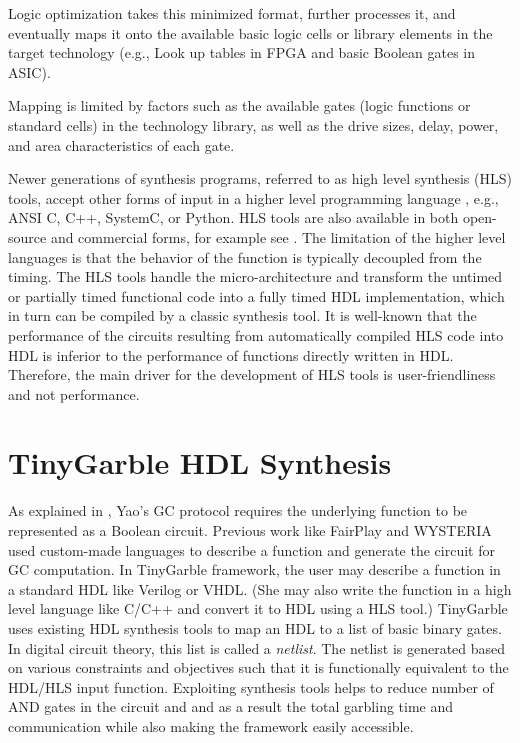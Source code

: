 Logic optimization takes this minimized format, further processes it, and eventually maps it onto the available basic logic cells or library elements in the target technology (e.g., Look up tables in FPGA and basic Boolean gates in ASIC).

Mapping is limited by factors such as the available gates (logic functions or standard cells) in the technology library, as well as the drive sizes, delay, power, and area characteristics of each gate.

Newer generations of synthesis programs, referred to as high level synthesis (HLS) tools, accept other forms of input in a higher level programming language \cite{Chapter:Zhang2008,chu1989hyper,corazao1996performance}, e.g., ANSI C, C++, SystemC, or Python.
HLS tools are also available in both open-source and commercial forms, for example see \cite{tool:Vivado,decaluwe2004myhdl,tool:PandA}.
The limitation of the higher level languages is that the behavior of the function is typically decoupled from the timing.
The HLS tools handle the micro-architecture and transform the untimed or partially timed functional code into a fully timed HDL implementation, which in turn can be compiled by a classic synthesis tool.
It is well-known that the performance of the circuits resulting from automatically compiled HLS code into HDL is inferior to the performance of functions directly written in HDL.
Therefore, the main driver for the development of HLS tools is user-friendliness and not performance.

\section{TinyGarble HDL Synthesis}
As explained in , Yao's GC protocol requires the underlying function to be represented as a Boolean circuit.
Previous work like FairPlay \cite{malkhi2004fairplay} and WYSTERIA \cite{rastogi2014wysteria} used custom-made languages to describe a function and generate the circuit for GC computation.
In TinyGarble framework, the user may describe a function in a standard HDL like Verilog or VHDL.
(She may also write the function in a high level language like C/C++ and convert it to HDL using a HLS tool.)
TinyGarble uses existing HDL synthesis tools to map an HDL to a list of basic binary gates.
In digital circuit theory, this list is called a \emph{netlist}.
The netlist is generated based on various constraints and objectives such that it is functionally equivalent to the HDL/HLS input function.
Exploiting synthesis tools helps to reduce number of AND gates in the circuit and and as a result the total garbling time and communication while also making the framework easily accessible.

